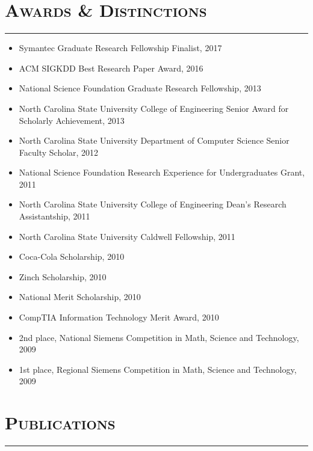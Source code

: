 \documentclass{article}
\newcommand{\HRule}{\rule{\linewidth}{0.5mm}}
\begin{document}
\section*{\bf \textsc{Awards \& Distinctions}}
\vspace{-5mm}\HRule
\begin{itemize}
\item Symantec Graduate Research Fellowship Finalist, 2017
\item ACM SIGKDD Best Research Paper Award, 2016
\item National Science Foundation Graduate Research Fellowship, 2013
\item North Carolina State University College of Engineering Senior Award for Scholarly Achievement, 2013
\item North Carolina State University Department of Computer Science Senior Faculty Scholar, 2012
 \item National Science Foundation Research Experience for Undergraduates Grant, 2011
 \item North Carolina State University College of Engineering Dean's Research Assistantship, 2011
\item North Carolina State University Caldwell Fellowship, 2011
\item Coca-Cola Scholarship, 2010
\item Zinch Scholarship, 2010
\item National Merit Scholarship, 2010
\item CompTIA Information Technology Merit Award, 2010
\item 2nd place, National Siemens Competition in Math, Science and Technology, 2009
\item 1st place, Regional Siemens Competition in Math, Science and Technology, 2009
\end{itemize}

\section*{\bf \textsc{Publications}}
\vspace{-5mm}\HRule
\end{document}
